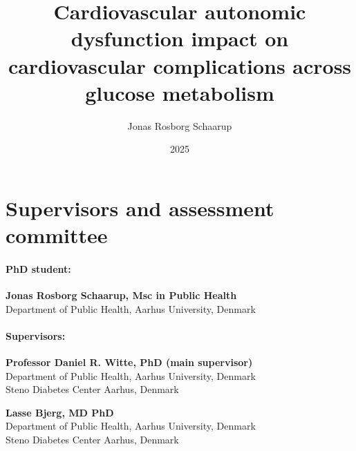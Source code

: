 \documentclass[
  letterpaper,
  headsepline=true,
  open=any]{scrbook}
\title{Cardiovascular autonomic dysfunction impact on cardiovascular
complications across glucose metabolism}
\author{Jonas Rosborg Schaarup}
\date{2025}
\begin{document}
\frontmatter
\maketitle
\ifdefined\Shaded\renewenvironment{Shaded}{\begin{tcolorbox}[interior hidden, frame hidden, boxrule=0pt, sharp corners, borderline west={3pt}{0pt}{shadecolor}, enhanced, breakable]}{\end{tcolorbox}}\fi

\mainmatter
{}

\hypertarget{section}{%
\chapter{}\label{section}}


\hypertarget{supervisors-and-assessment-committee}{%
\chapter*{Supervisors and assessment
committee}\label{supervisors-and-assessment-committee}}


\hypertarget{phd-student}{%
\subsubsection*{PhD student:}\label{phd-student}}

\textbf{Jonas Rosborg Schaarup, Msc in Public Health}\\
Department of Public Health, Aarhus University, Denmark

\hypertarget{supervisors}{%
\subsubsection*{Supervisors:}\label{supervisors}}

\textbf{Professor Daniel R. Witte, PhD (main supervisor)}\\
Department of Public Health, Aarhus University, Denmark\\
Steno Diabetes Center Aarhus, Denmark

\textbf{Lasse Bjerg, MD PhD}\\
Department of Public Health, Aarhus University, Denmark\\
Steno Diabetes Center Aarhus, Denmark
\end{document}
